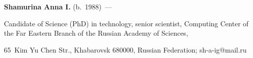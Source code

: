 \vspace*{3pt}



\noindent

\textbf{Shamurina Anna I.} (b.\ 1988)~--- 

Candidate of Science (PhD) in technology, senior scientist, Computing Center of the Far Eastern Branch of the Russian Academy of Sciences, 

65~Kim Yu Chen Str., Khabarovsk 680000, Russian Federation; \mbox{sh-a-ig@mail.ru}  





\label{end\stat}



\renewcommand{\bibname}{\protect\rm Литература} 

